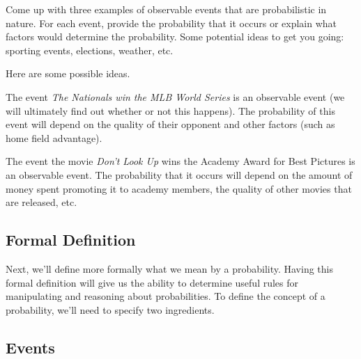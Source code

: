 \documentclass[assignment01_Solutions]{subfiles}
\begin{document}
\vspace{1em}
\begin{exercise}[(10 minutes)]
Come up with three examples of observable events that are probabilistic in nature.  For each event, provide the probability that it occurs or explain what factors would determine the probability.  Some potential ideas to get you going: sporting events, elections, weather, etc.

\begin{boxedsolution}
Here are some possible ideas.
\bi
\item The event \emph{The Nationals win the MLB World Series} is an observable event (we will ultimately find out whether or not this happens).  The probability of this event will depend on the quality of their opponent and other factors (such as home field advantage).
\item The event the movie \emph{Don't Look Up} wins the Academy Award for Best Pictures is an observable event.  The probability that it occurs will depend on the amount of money spent promoting it to academy members, the quality of other movies that are released, etc.
\ei
\end{boxedsolution}

\end{exercise}

\subsection{Formal Definition}

Next, we'll define more formally what we mean by a probability.  Having this formal definition will give us the ability to determine useful rules for manipulating and reasoning about probabilities.  To define the concept of a probability, we'll need to specify two ingredients.
\subsection{Events}
\end{document}

